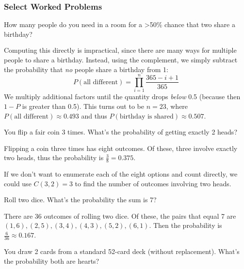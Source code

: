 \subsubsection{Select Worked Problems}

\begin{problem}
How many people do you need in a room for a >50\% chance that two share a birthday?
\end{problem}

\begin{solution}
Computing this directly is impractical, since there are many ways for multiple people to share a birthday. Instead, using the complement, we simply subtract the probability that \textit{no} people share a birthday from 1:
\[
P(\text{all different}) = \prod\limits_{i=1}^{n} \frac{365 - i + 1}{365}
\]
We multiply additional factors until the quantity drops \textit{below} 0.5 (because then $1 - P$ is greater than 0.5). This turns out to be $n=23$, where $P(\text{all different}) \approx 0.493$ and thus $P(\text{birthday is shared}) \approx 0.507$.
\end{solution}

\begin{problem}
You flip a fair coin 3 times. What's the probability of getting exactly 2 heads?
\end{problem}

\begin{solution}
Flipping a coin three times has eight outcomes. Of these, three involve exactly two heads, thus the probability is $\frac{3}{8} = 0.375$.

If we don't want to enumerate each of the eight options and count directly, we could use $C(3, 2) = 3$ to find the number of outcomes involving two heads.
\end{solution}


\begin{problem}
Roll two dice. What's the probability the sum is 7?
\end{problem}

\begin{solution}
There are 36 outcomes of rolling two dice. Of these, the pairs that equal 7 are $(1,6), (2,5), (3,4), (4,3), (5,2), (6,1)$. Then the probability is $\frac{6}{36} \approx 0.167$.
\end{solution}

\begin{problem}
You draw 2 cards from a standard 52-card deck (without replacement). What's the probability both are hearts?
\end{problem}

